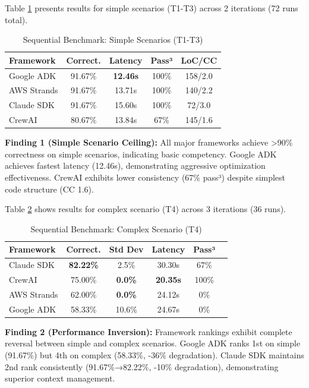 \documentclass[sigconf,nonacm]{acmart}
\begin{document}
Table \ref{tab:sequential-simple} presents results for simple scenarios (T1-T3) across 2 iterations (72 runs total).

\begin{table}[h]
\caption{Sequential Benchmark: Simple Scenarios (T1-T3)}
\label{tab:sequential-simple}
\begin{tabular}{lcccc}
\toprule
\textbf{Framework} & \textbf{Correct.} & \textbf{Latency} & \textbf{Pass³} & \textbf{LoC/CC} \\
\midrule
Google ADK & 91.67\% & \textbf{12.46s} & 100\% & 158/2.0 \\
AWS Strands & 91.67\% & 13.71s & 100\% & 140/2.2 \\
Claude SDK & 91.67\% & 15.60s & 100\% & 72/3.0 \\
CrewAI & 80.67\% & 13.84s & 67\% & 145/1.6 \\
\bottomrule
\end{tabular}
\end{table}

\textbf{Finding 1 (Simple Scenario Ceiling):} All major frameworks achieve >90\% correctness on simple scenarios, indicating basic competency. Google ADK achieves fastest latency (12.46s), demonstrating aggressive optimization effectiveness. CrewAI exhibits lower consistency (67\% pass³) despite simplest code structure (CC 1.6).

Table \ref{tab:sequential-complex} shows results for complex scenario (T4) across 3 iterations (36 runs).

\begin{table}[h]
\caption{Sequential Benchmark: Complex Scenario (T4)}
\label{tab:sequential-complex}
\begin{tabular}{lccccc}
\toprule
\textbf{Framework} & \textbf{Correct.} & \textbf{Std Dev} & \textbf{Latency} & \textbf{Pass³} \\
\midrule
Claude SDK & \textbf{82.22\%} & 2.5\% & 30.30s & 67\% \\
CrewAI & 75.00\% & \textbf{0.0\%} & \textbf{20.35s} & 100\% \\
AWS Strands & 62.00\% & \textbf{0.0\%} & 24.12s & 0\% \\
Google ADK & 58.33\% & 10.6\% & 24.67s & 0\% \\
\bottomrule
\end{tabular}
\end{table}

\textbf{Finding 2 (Performance Inversion):} Framework rankings exhibit complete reversal between simple and complex scenarios. Google ADK ranks 1st on simple (91.67\%) but 4th on complex (58.33\%, -36\% degradation). Claude SDK maintains 2nd rank consistently (91.67\%→82.22\%, -10\% degradation), demonstrating superior context management.
\end{document}
